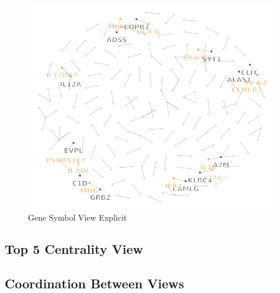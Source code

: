 \documentclass[12pt,twocolumn,twoside]{article}
\begin{document}
\begin{figure}
	\includegraphics[width=.95\linewidth]{net2.png}
	\caption{Gene Symbol View Explicit}
	\label{net2}
\end{figure}


\subsection*{Top 5 Centrality View}
\subsection*{Coordination Between Views}

\clearpage

 
\end{document}

